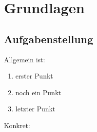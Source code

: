 \chapter{Grundlagen}
\section{Aufgabenstellung}

Allgemein ist:

\begin{enumerate}
 \item erster Punkt
 \item noch ein Punkt
 \item letzter Punkt
\end{enumerate}

Konkret:
